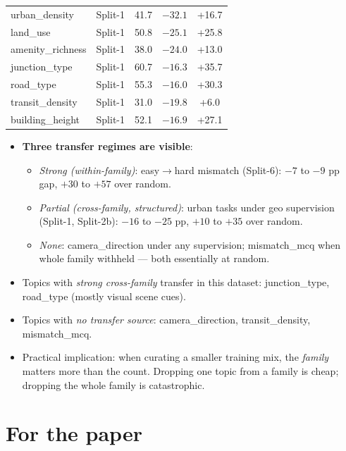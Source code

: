 \documentclass[11pt]{article}
\newcommand{\bad}[1]{\textcolor{bad}{\textbf{#1}}}
\begin{document}
\begin{table}[h]
\begin{tabular}{l l c c c}
\midrule
urban\_density          & Split-1                     & 41.7 & \bad{$-32.1$} & +16.7 \\
land\_use               & Split-1                     & 50.8 & \bad{$-25.1$} & +25.8 \\
amenity\_richness       & Split-1                     & 38.0 & \bad{$-24.0$} & +13.0 \\
junction\_type          & Split-1                     & 60.7 & \bad{$-16.3$} & +35.7 \\
road\_type              & Split-1                     & 55.3 & \bad{$-16.0$} & +30.3 \\
transit\_density        & Split-1                     & 31.0 & \bad{$-19.8$} & +6.0 \\
building\_height        & Split-1                     & 52.1 & \bad{$-16.9$} & +27.1 \\
\bottomrule
\end{tabular}
\end{table}

\begin{itemize}\itemsep1pt
\item \textbf{Three transfer regimes are visible}:
\begin{itemize}\itemsep0pt
\item \emph{Strong (within-family)}: easy$\to$hard mismatch (Split-6): $-7$ to $-9$ pp gap, $+30$ to $+57$ over random.
\item \emph{Partial (cross-family, structured)}: urban tasks under geo supervision (Split-1, Split-2b): $-16$ to $-25$ pp, $+10$ to $+35$ over random.
\item \emph{None}: camera\_direction under any supervision; mismatch\_mcq when whole family withheld --- both essentially at random.
\end{itemize}
\item Topics with \emph{strong cross-family} transfer in this dataset: junction\_type, road\_type (mostly visual scene cues).
\item Topics with \emph{no transfer source}: camera\_direction, transit\_density, mismatch\_mcq.
\item Practical implication: when curating a smaller training mix, the \emph{family} matters more than the count. Dropping one topic from a family is cheap; dropping the whole family is catastrophic.
\end{itemize}

\newpage
\section{For the paper}
\end{document}
